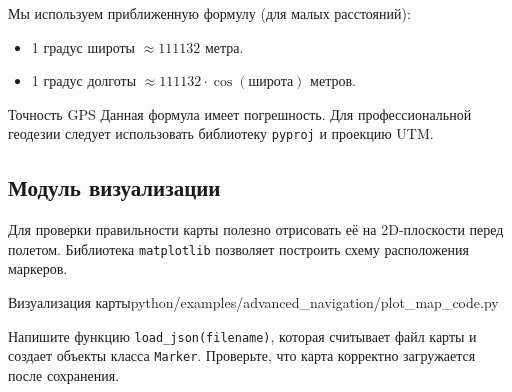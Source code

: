 Мы используем приближенную формулу (для малых расстояний):
\begin{itemize}
    \item 1 градус широты $\approx 111132$ метра.
    \item 1 градус долготы $\approx 111132 \cdot \cos(\text{широта})$ метров.
\end{itemize}

\begin{warnbox}{Точность GPS}
Данная формула имеет погрешность. Для профессиональной геодезии следует использовать библиотеку \texttt{pyproj} и проекцию UTM.
\end{warnbox}

\subsection{Модуль визуализации}
Для проверки правильности карты полезно отрисовать её на 2D-плоскости перед полетом. Библиотека \texttt{matplotlib} позволяет построить схему расположения маркеров.

\begin{codefiletitle}[python]{Визуализация карты}{python/examples/advanced_navigation/plot_map_code.py}
\end{codefiletitle}

\begin{taskbox}
Напишите функцию \texttt{load\_json(filename)}, которая считывает файл карты и создает объекты класса \texttt{Marker}. Проверьте, что карта корректно загружается после сохранения.
\end{taskbox}
